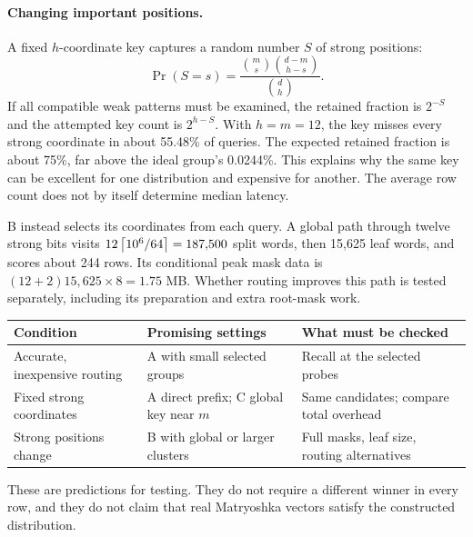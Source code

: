\paragraph{Changing important positions.} A fixed $h$-coordinate key captures a random
number $S$ of strong positions:
\begin{equation}
 \Pr(S=s)=\frac{\binom ms\binom{d-m}{h-s}}{\binom dh}.
 \label{eq:overlap}
\end{equation}
If all compatible weak patterns must be examined, the retained fraction is $2^{-S}$ and
the attempted key count is $2^{h-S}$. With $h=m=12$, the key misses every strong coordinate
in about 55.48\% of queries. The expected retained fraction is about 75\%, far above the
ideal group's 0.0244\%. This explains why the same key can be excellent for one distribution
and expensive for another. The average row count does not by itself determine median latency.

B instead selects its coordinates from each query. A global path through twelve strong
bits visits $12\left\lceil 10^6/64\right\rceil=187{,}500$ split words, then 15,625 leaf words, and scores about 244
rows. Its conditional peak mask data is $(12+2)15{,}625\times8=1.75$ MB. Whether routing improves
this path is tested separately, including its preparation and extra root-mask work.

\begin{center}\small
\begin{tabularx}{\linewidth}{@{}lYY@{}}\toprule
Condition & Promising settings & What must be checked\\\midrule
Accurate, inexpensive routing & A with small selected groups & Recall at the selected probes\\
Fixed strong coordinates & A direct prefix; C global key near $m$ & Same candidates; compare total overhead\\
Strong positions change & B with global or larger clusters & Full masks, leaf size, routing alternatives\\\bottomrule
\end{tabularx}\normalsize
\end{center}
These are predictions for testing. They do not require a different winner in every row,
and they do not claim that real Matryoshka vectors satisfy the constructed distribution.
